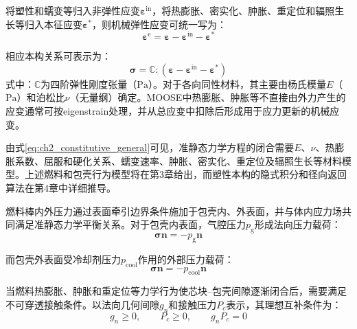 将塑性和蠕变等归入非弹性应变$\boldsymbol{\varepsilon}^{\mathrm{in}}$，将热膨胀、密实化、肿胀、重定位和辐照生长等归入本征应变$\boldsymbol{\varepsilon}^{*}$，则机械弹性应变可统一写为：
\begin{equation}
	\boldsymbol{\varepsilon}^{\mathrm{e}}
	=\boldsymbol{\varepsilon}
	-\boldsymbol{\varepsilon}^{\mathrm{in}}
	-\boldsymbol{\varepsilon}^{*}
	\label{eq:ch2_elastic_strain}
\end{equation}

相应本构关系可表示为：
\begin{equation}
	\boldsymbol{\sigma}
	=\mathbb C:
	\left(
	\boldsymbol{\varepsilon}
	-\boldsymbol{\varepsilon}^{\mathrm{in}}
	-\boldsymbol{\varepsilon}^{*}
	\right)
	\label{eq:ch2_constitutive_general}
\end{equation}
\noindent 式中：$\mathbb C$为四阶弹性刚度张量（$\mathrm{Pa}$）。对于各向同性材料，其主要由杨氏模量$E$（$\mathrm{Pa}$）和泊松比$\nu$（无量纲）确定。MOOSE中热膨胀、肿胀等不直接由外力产生的应变通常可按eigenstrain处理，并从总应变中扣除后形成用于应力更新的机械应变。

由式\eqref{eq:ch2_constitutive_general}可见，准静态力学方程的闭合需要$E$、$\nu$、热膨胀系数、屈服和硬化关系、蠕变速率、肿胀、密实化、重定位及辐照生长等材料模型。上述燃料和包壳行为模型将在第3章给出，而塑性本构的隐式积分和径向返回算法在第4章中详细推导。


燃料棒内外压力通过表面牵引边界条件施加于包壳内、外表面，并与体内应力场共同满足准静态力学平衡关系。对于包壳内表面，气腔压力$p_{\mathrm g}$形成法向压力载荷：
\begin{equation}
	\boldsymbol{\sigma}\mathbf n
	=-p_{\mathrm g}\mathbf n
	\label{eq:ch2_internal_pressure_bc}
\end{equation}

而包壳外表面受冷却剂压力$p_{\mathrm{cool}}$作用的外部压力载荷：
\begin{equation}
	\boldsymbol{\sigma}\mathbf n
	=-p_{\mathrm{cool}}\mathbf n
	\label{eq:ch2_external_pressure_bc}
\end{equation}

当燃料热膨胀、肿胀和重定位等力学行为使芯块--包壳间隙逐渐闭合后，需要满足不可穿透接触条件。以法向几何间隙$g_n$和接触压力$P_c$表示，其理想互补条件为：
\begin{equation}
	g_n\ge 0,\qquad
	P_c\ge 0,\qquad
	g_nP_c=0
	\label{eq:ch2_contact_complementarity}
\end{equation}

